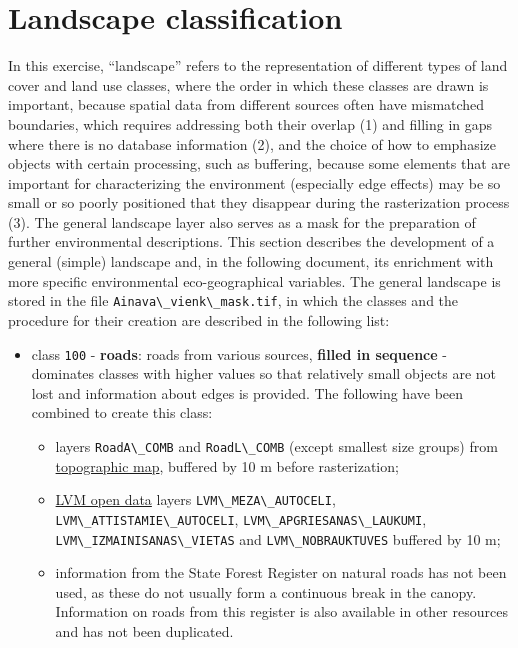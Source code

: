 \documentclass[
]{book}
\newcommand{\passthrough}[1]{#1}
\begin{document}
\section{Landscape classification}\label{Ch05.03}

In this exercise, ``landscape'' refers to the representation of different types
of land cover and land use classes, where the order in which these classes are
drawn is important, because spatial data from different sources often have
mismatched boundaries, which requires addressing both their overlap (1) and
filling in gaps where there is no database information (2), and the choice of
how to emphasize objects with certain processing, such as buffering, because
some elements that are important for characterizing the environment (especially
edge effects) may be so small or so poorly positioned that they disappear during
the rasterization process (3). The general landscape layer also serves as a
mask for the preparation of further environmental descriptions. This section
describes the development of a general (simple) landscape and, in the following
document, its enrichment with more specific environmental eco-geographical
variables. The general landscape is stored in the file \passthrough{\lstinline!Ainava\_vienk\_mask.tif!},
in which the classes and the procedure for their creation are described in the
following list:

\begin{itemize}
\item
  class \passthrough{\lstinline!100!} - \textbf{roads}: roads from various sources, \textbf{filled in sequence} -
  dominates classes with higher values so that relatively small objects are not
  lost and information about edges is provided. The following have been
  combined to create this class:

  \begin{itemize}
  \item
    layers \passthrough{\lstinline!RoadA\_COMB!} and \passthrough{\lstinline!RoadL\_COMB!} (except smallest size groups) from
    \hyperref[Ch04.04]{topographic map}, buffered by 10 m before rasterization;
  \item
    \hyperref[Ch04.06]{LVM open data} layers \passthrough{\lstinline!LVM\_MEZA\_AUTOCELI!}, \passthrough{\lstinline!LVM\_ATTISTAMIE\_AUTOCELI!},
    \passthrough{\lstinline!LVM\_APGRIESANAS\_LAUKUMI!}, \passthrough{\lstinline!LVM\_IZMAINISANAS\_VIETAS!} and \passthrough{\lstinline!LVM\_NOBRAUKTUVES!}
    buffered by 10 m;
  \item
    information from the State Forest Register on natural roads has not
    been used, as these do not usually form a continuous break in the canopy.
    Information on roads from this register is also available in other
    resources and has not been duplicated.
  \end{itemize}
\end{itemize}
\end{document}
